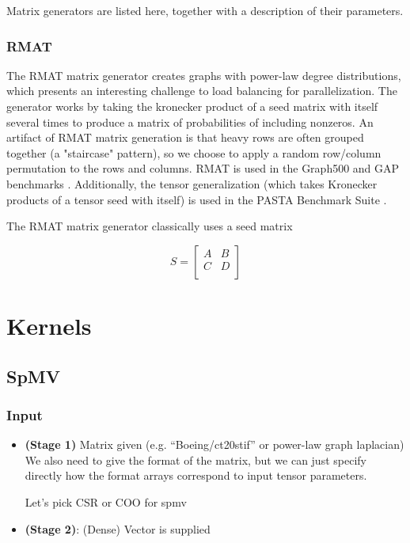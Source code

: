 \documentclass{article}
\begin{document}
    Matrix generators are listed here, together with a description of their parameters.

\subsubsection{RMAT}
    The RMAT matrix generator \cite{chakrabarti_r-mat_2004} creates graphs with power-law degree distributions, which presents an interesting challenge to load balancing for parallelization. The generator works by taking the kronecker product of a seed matrix with itself several times to produce a matrix of probabilities of including nonzeros. An artifact of RMAT matrix generation is that heavy rows are often grouped together (a "staircase" pattern), so we choose to apply a random row/column permutation to the rows and columns. RMAT is used in the Graph500 and GAP benchmarks \cite{noauthor_graph_nodate, beamer_gap_2017}. Additionally, the tensor generalization (which takes Kronecker products of a tensor seed with itself) is used in the PASTA Benchmark Suite \cite{li_pasta_2019}.

    The RMAT matrix generator classically uses a seed matrix

	\[
		S = \left[\begin{array}{|c|c|}
			A & B \\
			C & D \\
		\end{array}\right]
	\]

\section{Kernels}

\subsection{SpMV}

\subsubsection{Input}
\begin{itemize}
\item \textbf{(Stage 1)}
		Matrix given (e.g. “Boeing/ct20stif” or power-law graph laplacian)
		We also need to give the format of the matrix, but we can just specify directly how the format arrays correspond to input tensor parameters.

		Let’s pick CSR or COO for spmv
\item \textbf{(Stage 2)}:
		(Dense) Vector is supplied
\end{itemize}
\end{document}
